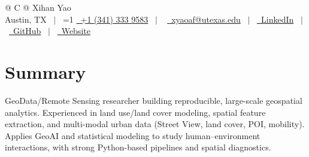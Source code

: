 \documentclass[a4paper,12pt]{article}
\providecommand{\PrivateBuild}{0}
\begin{document}
\pagestyle{empty}

\begin{tabularx}{\linewidth}{@{} C @{}}
{\Huge Xihan Yao \quad {\Large }} \\[6pt]

Austin, TX \ $|$ \
\ifnum\PrivateBuild=1
\href{tel:+13413339583}{\raisebox{-0.05\height}\faMobile\ +1 (341) 333 9583} \ $|$ \
\fi
\href{mailto:xyaoaf@utexas.edu}{\raisebox{-0.05\height}\faEnvelope\ xyaoaf@utexas.edu} \ $|$ \
\href{https://www.linkedin.com/in/xihan-yao-6381b3181/}{\raisebox{-0.05\height}\faLinkedin\ LinkedIn} \ $|$ \
\href{https://github.com/xyaoaf}{\raisebox{-0.05\height}\faGithub\ GitHub} \ $|$ \
\href{https://xyaoaf.github.io/}{\raisebox{-0.05\height}\faGlobe\ Website}

\end{tabularx}



\section{Summary}
GeoData/Remote Sensing researcher building reproducible, large-scale geospatial analytics.
Experienced in land use/land cover modeling, spatial feature extraction, and multi-modal urban data (Street View, land cover, POI, mobility). Applies GeoAI and statistical modeling to study human–environment interactions, with strong Python-based pipelines and spatial diagnostics.


\end{document}
